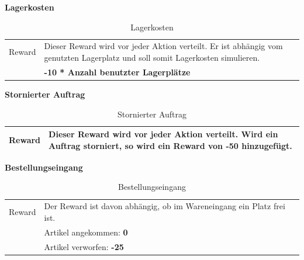 \noindent\textbf{Lagerkosten}
\begin{table}[H]%
\begin{tabularx}{\textwidth} { 
  | >{\raggedright\arraybackslash}l 
  | >{\raggedright\arraybackslash}X | }
 \hline
 Reward &Dieser Reward wird vor jeder Aktion verteilt. Er ist abhängig vom genutzten Lagerplatz und soll somit Lagerkosten simulieren.\\
        &\textbf{-10 * Anzahl benutzter Lagerplätze}\\
\hline
\end{tabularx}
\caption{Lagerkosten}
\end{table}%

\noindent\textbf{Stornierter Auftrag}
\begin{table}[H]%
\begin{tabularx}{\textwidth} { 
  | >{\raggedright\arraybackslash}l 
  | >{\raggedright\arraybackslash}X | }
 \hline
 Reward &Dieser Reward wird vor jeder Aktion verteilt. Wird ein Auftrag storniert, so wird ein Reward von \textbf{-50} hinzugefügt.\\
\hline
\end{tabularx}
\caption{Stornierter Auftrag}
\end{table}%
\noindent\textbf{Bestellungseingang}
\begin{table}[ht]%
\begin{tabularx}{\textwidth} { 
  | >{\raggedright\arraybackslash}l 
  | >{\raggedright\arraybackslash}X | }
 \hline
 Reward	&Der Reward ist davon abhängig, ob im Wareneingang ein Platz frei ist.\\
&Artikel angekommen: \textbf{0}\\
&Artikel verworfen: \textbf{-25}\\
\hline
\end{tabularx}
\caption{Bestellungseingang}
\end{table}%

\newpage

